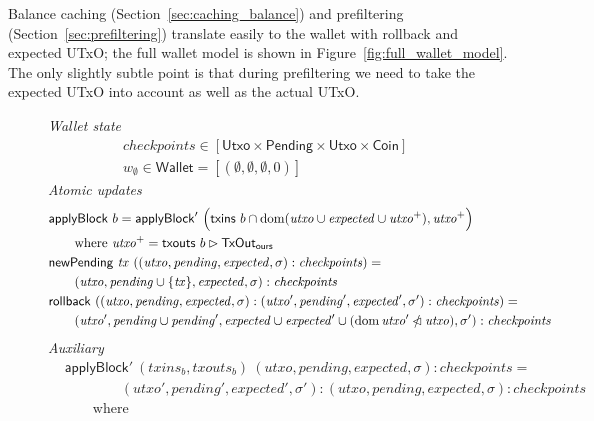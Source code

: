 \documentclass{article}
\newcommand{\restrictdom}{\lhd}
\newcommand{\subtractdom}{\mathbin{\slashed{\restrictdom}}}
\newcommand{\restrictrange}{\rhd}
\DeclareMathOperator{\dom}{dom}
\numberwithin{equation}{lemma}
\begin{document}
Balance caching (Section~\ref{sec:caching_balance}) and prefiltering
(Section~\ref{sec:prefiltering}) translate easily to the wallet with
rollback and expected UTxO; the full wallet model is shown in
Figure~\ref{fig:full_wallet_model}. The only slightly subtle point is
that during prefiltering we need to take the expected UTxO into account as
well as the actual UTxO.

\begin{figure}
%
\emph{Wallet state}
%
\begin{align*}
& \mathit{checkpoints} \in [\mathsf{Utxo} \times \mathsf{Pending} \times \mathsf{Utxo} \times \mathsf{Coin}] \\
& w_\emptyset \in \mathsf{Wallet} = [(\emptyset, \emptyset, \emptyset, 0)]
\end{align*}
%
\emph{Atomic updates}
%
\begin{align*}
& \mathsf{applyBlock} ~ b
  = \mathsf{applyBlock}' ~ \Big( \mathsf{txins} ~ b \cap \dom (\mathit{utxo} \cup \mathit{expected} \cup \mathit{utxo}^+), \mathit{utxo}^+ \Bigr) \\
& \qquad \text{where~} \mathit{utxo}^+ = \mathsf{txouts} ~ b \restrictrange \mathsf{TxOut_{ours}} \\
& \mathsf{newPending} ~ \mathit{tx} ~ ((\mathit{utxo}, \mathit{pending}, \mathit{expected}, \sigma) : \mathit{checkpoints}) = \\
& \qquad (\mathit{utxo}, \mathit{pending} \cup \{\mathit{tx}\}, \mathit{expected}, \sigma) : \mathit{checkpoints} \\
& \mathsf{rollback} ~ ((\mathit{utxo}, \mathit{pending}, \mathit{expected}, \sigma) : (\mathit{utxo}', \mathit{pending}', \mathit{expected}', \sigma') : \mathit{checkpoints}) = \\
& \qquad (\mathit{utxo}', \mathit{pending} \cup \mathit{pending}', \mathit{expected} \cup \mathit{expected}' \cup (\dom \mathit{utxo}' \subtractdom \mathit{utxo}), \sigma') : \mathit{checkpoints} \\
\end{align*}
%
\emph{Auxiliary}
%
\begin{align*}
& \mathsf{applyBlock'} ~ (\mathit{txins}_b, \mathit{txouts}_b) ~ (\mathit{utxo}, \mathit{pending}, \mathit{expected}, \sigma) : \mathit{checkpoints} = \\
& \qquad\qquad (\mathit{utxo}', \mathit{pending}', \mathit{expected}', \sigma') : (\mathit{utxo}, \mathit{pending}, \mathit{expected}, \sigma) : \mathit{checkpoints} \\
& \qquad \text{where}

\end{align*}
\end{figure}
\end{document}
